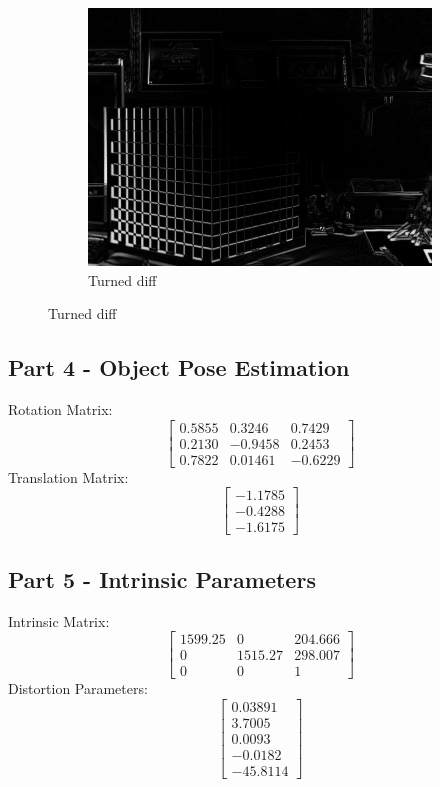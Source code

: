 \documentclass[12pt,a4paper,final]{article}
\begin{document}
\begin{figure}[h]
\begin{subfigure}{.3\textwidth}
  \includegraphics[width=.9\linewidth]{turned_diff}
  \caption{Turned diff}
  \label{fig:sub3}
\end{subfigure}
\label{fig:test}
\end{figure}

\subsection*{Part 4 - Object Pose Estimation}

Rotation Matrix:
\begin{equation*}
\begin{bmatrix}
0.5855 & 0.3246 & 0.7429 \\
  0.2130 & -0.9458 & 0.2453 \\
  0.7822 & 0.01461 & -0.6229
\end{bmatrix}
\end{equation*}
Translation Matrix:
\begin{equation*}
\begin{bmatrix}
-1.1785 \\ -0.4288 \\ -1.6175
\end{bmatrix}
\end{equation*}

\subsection*{Part 5 - Intrinsic Parameters}
Intrinsic Matrix:
\begin{equation*}
\begin{bmatrix}
1599.25 & 0 & 204.666\\ 0 & 1515.27 & 298.007\\ 0 & 0 & 1
\end{bmatrix}
\end{equation*}
Distortion Parameters:
\begin{equation*}
\begin{bmatrix}
0.03891 \\ 3.7005 \\ 0.0093\\ -0.0182 \\-45.8114
\end{bmatrix}
\end{equation*}
\end{document}
